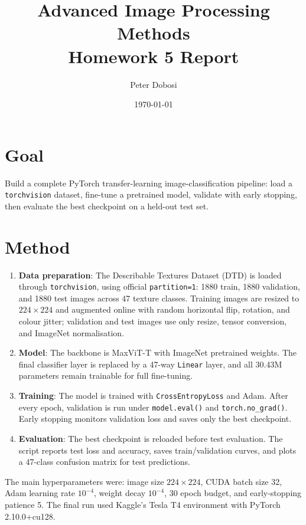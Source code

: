 \documentclass[11pt,a4paper]{article}
\title{Advanced Image Processing Methods\\Homework 5 Report}
\author{Peter Dobosi}
\date{\today}
\begin{document}
\maketitle

\section*{Goal}
Build a complete PyTorch transfer-learning image-classification pipeline: load a \texttt{torchvision} dataset, fine-tune a pretrained model, validate with early stopping, then evaluate the best checkpoint on a held-out test set.

\section*{Method}
\begin{enumerate}[leftmargin=*,itemsep=1pt,topsep=2pt]
    \item \textbf{Data preparation}: The Describable Textures Dataset (DTD) is loaded through \texttt{torchvision}, using official \texttt{partition=1}: 1880 train, 1880 validation, and 1880 test images across 47 texture classes.
    Training images are resized to $224\times224$ and augmented online with random horizontal flip, rotation, and colour jitter; validation and test images use only resize, tensor conversion, and ImageNet normalisation.

    \item \textbf{Model}: The backbone is MaxViT-T with ImageNet pretrained weights. The final classifier layer is replaced by a 47-way \texttt{Linear} layer, and all 30.43M parameters remain trainable for full fine-tuning.

    \item \textbf{Training}: The model is trained with \texttt{CrossEntropyLoss} and Adam. After every epoch, validation is run under \texttt{model.eval()} and \texttt{torch.no\_grad()}. Early stopping monitors validation loss and saves only the best checkpoint.

    \item \textbf{Evaluation}: The best checkpoint is reloaded before test evaluation. The script reports test loss and accuracy, saves train/validation curves, and plots a 47-class confusion matrix for test predictions.
\end{enumerate}

The main hyperparameters were: image size $224\times224$, CUDA batch size 32, Adam learning rate $10^{-4}$, weight decay $10^{-4}$, 30 epoch budget, and early-stopping patience 5. The final run used Kaggle's Tesla T4 environment with PyTorch 2.10.0+cu128.
\end{document}
